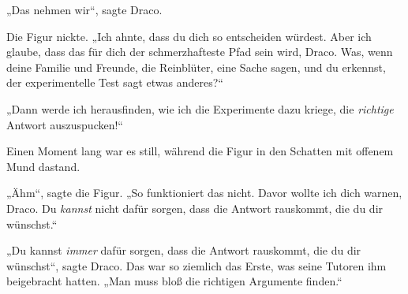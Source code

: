 „Das nehmen wir“, sagte Draco.

Die Figur nickte.
„Ich ahnte, dass du dich so entscheiden würdest. Aber ich glaube, dass das für dich der schmerzhafteste Pfad sein wird, Draco. Was, wenn deine Familie und Freunde, die Reinblüter, eine Sache sagen, und du erkennst, der experimentelle Test sagt etwas anderes?“

„Dann werde ich herausfinden, wie ich die Experimente dazu kriege, die \emph{richtige} Antwort auszuspucken!“

Einen Moment lang war es still, während die Figur in den Schatten mit offenem Mund dastand.

„Ähm“, sagte die Figur.
„So funktioniert das nicht. Davor wollte ich dich warnen, Draco. Du \emph{kannst} nicht dafür sorgen, dass die Antwort rauskommt, die du dir wünschst.“

„Du kannst \emph{immer} dafür sorgen, dass die Antwort rauskommt, die du dir wünschst“, sagte Draco. Das war so ziemlich das Erste, was seine Tutoren ihm beigebracht hatten.
„Man muss bloß die richtigen Argumente finden.“

